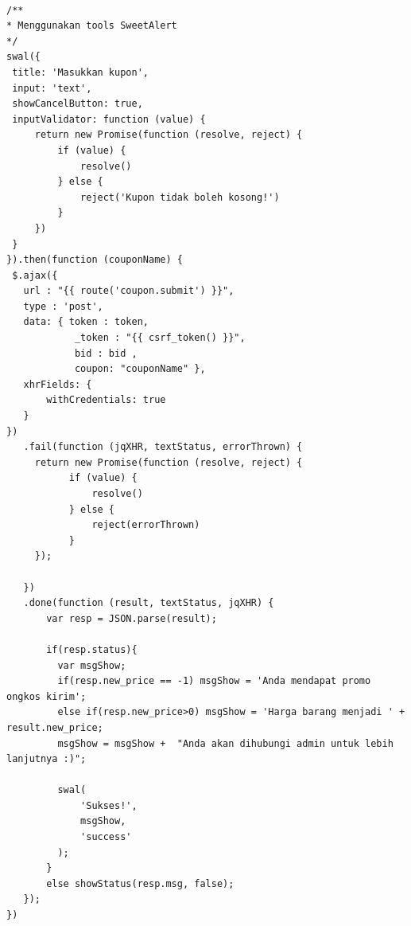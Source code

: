 \begin{lstlisting}[label=cdjq.04-06x,style=htmlcssjs,caption=Kode Sumber \textit{View Logic} Memasukkan Kupon]

/** 
* Menggunakan tools SweetAlert
*/
swal({
 title: 'Masukkan kupon',
 input: 'text',
 showCancelButton: true,
 inputValidator: function (value) {
     return new Promise(function (resolve, reject) {
         if (value) {
             resolve()
         } else {
             reject('Kupon tidak boleh kosong!')
         }
     })
 }
}).then(function (couponName) {
 $.ajax({
   url : "{{ route('coupon.submit') }}",
   type : 'post',
   data: { token : token,
            _token : "{{ csrf_token() }}",
            bid : bid ,
            coupon: "couponName" },
   xhrFields: {
       withCredentials: true
   }
})
   .fail(function (jqXHR, textStatus, errorThrown) {
     return new Promise(function (resolve, reject) {
	       if (value) {
	           resolve()
	       } else {
	           reject(errorThrown)
	       }
     });

   })
   .done(function (result, textStatus, jqXHR) {
       var resp = JSON.parse(result);

       if(resp.status){
         var msgShow;
         if(resp.new_price == -1) msgShow = 'Anda mendapat promo ongkos kirim';
         else if(resp.new_price>0) msgShow = 'Harga barang menjadi ' + result.new_price;
         msgShow = msgShow +  "Anda akan dihubungi admin untuk lebih lanjutnya :)";

         swal(
             'Sukses!',
             msgShow,
             'success'
         );
       }
       else showStatus(resp.msg, false);
   });
})

\end{lstlisting}


